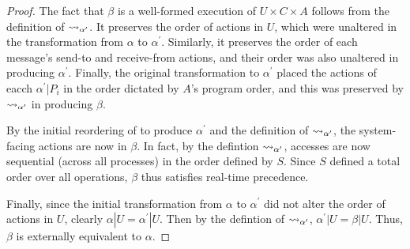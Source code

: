 \begin{proof}
  The fact that $\beta$ is a well-formed execution of $U \times C \times A$ follows
  from the definition of $\rightsquigarrow_{\alpha^\prime}$. It preserves the order of actions
  in $U$, which were unaltered in the transformation from $\alpha$ to $\alpha^\prime$.
  Similarly, it preserves the order of each message's send-to and receive-from actions,
  and their order was also unaltered in producing $\alpha^\prime$. Finally, the original
  transformation to $\alpha^\prime$ placed the actions of eacch $\alpha^\prime | P_i$ in
  the order dictated by $A$'s program order, and this was preserved by
  $\rightsquigarrow_{\alpha^\prime}$ in producing $\beta$.

  By the initial reordering of to produce $\alpha^\prime$ and the definition of
  $\rightsquigarrow_{\alpha^\prime}$, the system-facing actions are now \singledispatch{} in $\beta$.
  In fact, by the defintion $\rightsquigarrow_{\alpha^\prime}$, accesses are now sequential
  (across all processes) in the order defined by $S$. Since $S$ defined a total order over all
  operations, $\beta$ thus satisfies \singledispatch{} real-time precedence.

  Finally, since the initial transformation from $\alpha$ to $\alpha^\prime$ did not alter
  the order of actions in $U$, clearly $\alpha | U = \alpha^\prime | U$. Then by the defintion
  of $\rightsquigarrow_{\alpha^\prime}$, $\alpha^\prime | U = \beta | U$. Thus, $\beta$ is externally
  equivalent to $\alpha$.
\end{proof}